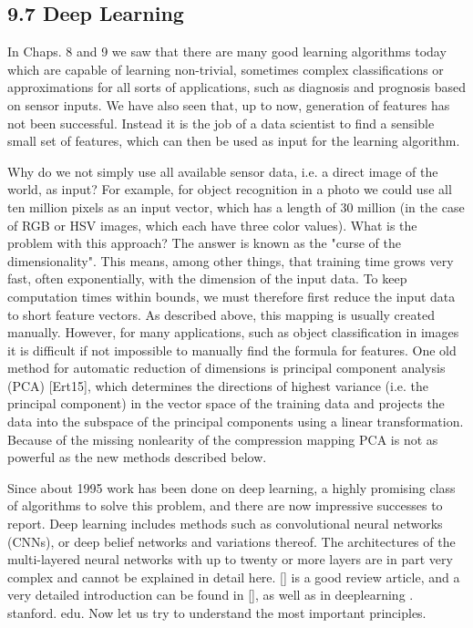\documentclass[10pt]{article}
\begin{document}
\subsection*{9.7 Deep Learning}
In Chaps. 8 and 9 we saw that there are many good learning algorithms today which are capable of learning non-trivial, sometimes complex classifications or approximations for all sorts of applications, such as diagnosis and prognosis based on sensor inputs. We have also seen that, up to now, generation of features has not been successful. Instead it is the job of a data scientist to find a sensible small set of features, which can then be used as input for the learning algorithm.

Why do we not simply use all available sensor data, i.e. a direct image of the world, as input? For example, for object recognition in a photo we could use all ten million pixels as an input vector, which has a length of 30 million (in the case of RGB or HSV images, which each have three color values). What is the problem with this approach? The answer is known as the "curse of the dimensionality". This means, among other things, that training time grows very fast, often exponentially, with the dimension of the input data. To keep computation times within bounds, we must therefore first reduce the input data to short feature vectors. As described above, this mapping is usually created manually. However, for many applications, such as object classification in images it is difficult if not impossible to manually find the formula for features. One old method for automatic reduction of dimensions is principal component analysis (PCA) [Ert15], which determines the directions of highest variance (i.e. the principal component) in the vector space of the training data and projects the data into the subspace of the principal components using a linear transformation. Because of the missing nonlearity of the compression mapping PCA is not as powerful as the new methods described below.

Since about 1995 work has been done on deep learning, a highly promising class of algorithms to solve this problem, and there are now impressive successes to report. Deep learning includes methods such as convolutional neural networks (CNNs), or deep belief networks and variations thereof. The architectures of the multi-layered neural networks with up to twenty or more layers are in part very complex and cannot be explained in detail here. [\cite{lecun2015deep}] is a good review article, and a very detailed introduction can be found in [\cite{goodfellow2016deep}], as well as in deeplearning . stanford. edu. Now let us try to understand the most important principles.
\end{document}
